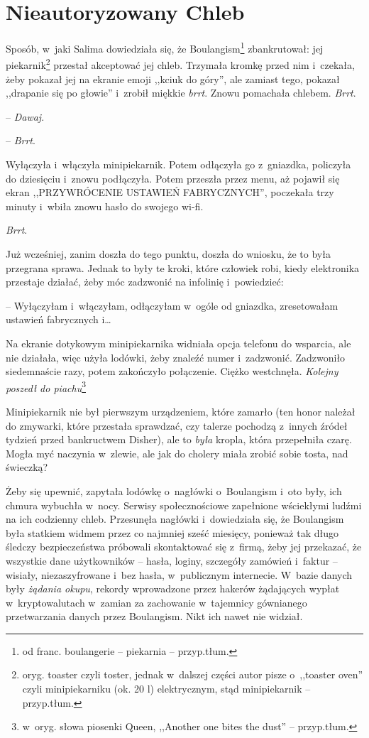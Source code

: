 \documentclass[oneside,polish,11pt,sfheadings]{mwbk}
\begin{document}
\vspace*{\fill}


\chapter*{Nieautoryzowany Chleb}

Sposób, w~jaki Salima dowiedziała się, że Boulangism\footnote{ od franc.
boulangerie -- piekarnia -- przyp.tłum.} zbankrutował: jej piekarnik\footnote{
oryg. toaster czyli toster, jednak w~dalszej części autor pisze o~,,toaster oven'' czyli minipiekarniku (ok. 20 l) elektrycznym, stąd
minipiekarnik -- przyp.tłum.} przestał akceptować jej chleb. Trzymała
kromkę przed nim i~czekała, żeby pokazał jej na ekranie emoji ,,kciuk do
góry'', ale zamiast tego, pokazał ,,drapanie się po głowie'' i~zrobił
miękkie \textit{brrt}. Znowu pomachała chlebem. \textit{Brrt}.

-- \textit{Dawaj}. 

-- \textit{Brrt}.

Wyłączyła i~włączyła minipiekarnik. Potem odłączyła go z~gniazdka,
policzyła do dziesięciu i~znowu podłączyła. Potem przeszła przez menu,
aż pojawił się ekran ,,PRZYWRÓCENIE USTAWIEŃ FABRYCZNYCH'', poczekała
trzy minuty i~wbiła znowu hasło do swojego wi-fi.

\textit{Brrt}.

Już wcześniej, zanim doszła do tego punktu, doszła do wniosku, że to
była przegrana sprawa. Jednak to były te kroki, które człowiek robi,
kiedy elektronika przestaje działać, żeby móc zadzwonić na infolinię i~powiedzieć: 

-- Wyłączyłam i~włączyłam, odłączyłam w~ogóle od gniazdka,
zresetowałam ustawień fabrycznych i\ldots 

Na ekranie dotykowym minipiekarnika widniała opcja telefonu do wsparcia,
ale nie działała, więc użyła lodówki, żeby znaleźć numer i~zadzwonić.
Zadzwoniło siedemnaście razy, potem zakończyło połączenie. Ciężko
westchnęła. \textit{Kolejny poszedł do piachu}\footnote{ w~oryg. słowa piosenki
Queen, ,,Another one bites the dust'' -- przyp.tłum.}

Minipiekarnik nie był pierwszym urządzeniem, które zamarło (ten honor
należał do zmywarki, które przestała sprawdzać, czy talerze pochodzą z~innych źródeł tydzień przed bankructwem Disher), ale to \textit{była}
kropla, która przepełniła czarę. Mogła myć naczynia w~zlewie, ale jak do
cholery miała zrobić sobie tosta, nad świeczką?

Żeby się upewnić, zapytała lodówkę o~nagłówki o~Boulangism i~oto były,
ich chmura wybuchła w~nocy. Serwisy społecznościowe zapełnione
wściekłymi ludźmi na ich codzienny chleb. Przesunęła nagłówki i~dowiedziała się, że Boulangism była statkiem widmem przez co najmniej
sześć miesięcy, ponieważ tak długo śledczy bezpieczeństwa próbowali
skontaktować się z~firmą, żeby jej przekazać, że wszystkie dane
użytkowników -- hasła, loginy, szczegóły zamówień i~faktur -- wisiały,
niezaszyfrowane i~bez hasła, w~publicznym internecie. W~bazie danych
były \textit{żądania okupu}, rekordy wprowadzone przez hakerów żądających
wypłat w~kryptowalutach w~zamian za zachowanie w~tajemnicy gównianego
przetwarzania danych przez Boulangism. Nikt ich nawet nie widział.
\end{document}

